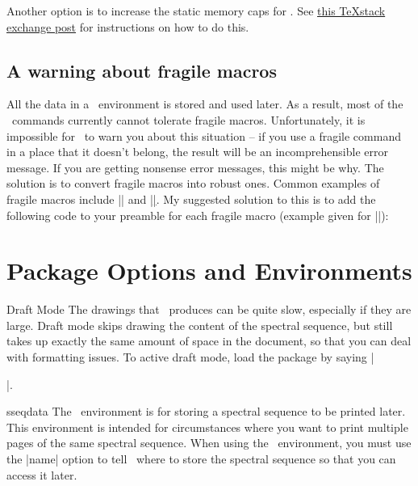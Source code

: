 \begin{sseqdata}[name = basic, cohomological Serre grading]
Another option is to increase the static memory caps for \pdfLaTeX. See \href{https://tex.stackexchange.com/a/26213}{this \TeX stack exchange post} for instructions on how to do this.

\subsection{A warning about fragile macros}
All the data in a \sseqpages\  environment is stored and used later. As a result, most of the \sseqpages\  commands currently cannot tolerate fragile macros. Unfortunately, it is impossible for \sseqpages\  to warn you about this situation -- if you use a fragile command in a place that it doesn't belong, the result will be an incomprehensible error message. If you are getting nonsense error messages, this might be why. The solution is to convert fragile macros into robust ones. Common examples of fragile macros include |\widehat| and |\underline|. My suggested solution to this is to add the following code to your preamble for each fragile macro (example given for |\mathbb|):
\begin{codeexample}
\let\oldwidehat\widehat
\protected\def\widehat{\oldwidehat}
\end{codeexample}


\section{Package Options and Environments}
\begin{manualentry}{Draft Mode}
The drawings that \sseqpages\ produces can be quite slow, especially if they are large. Draft mode skips drawing the content of the spectral sequence, but still takes up exactly the same amount of space in the document, so that you can deal with formatting issues. To active draft mode, load the package by saying |\usepackage[draft]{spectralsequences}|.
\end{manualentry}

\begin{environment}{{sseqdata}\moptions}
The \sseqdataenv\  environment is for storing a spectral sequence to be printed later. This environment is intended for circumstances where you want to print multiple pages of the same spectral sequence. When using the \sseqdataenv\  environment, you must use the |name| option to tell \sseqpages\  where to store the spectral sequence so that you can access it later.
\end{environment}


\end{sseqdata}
